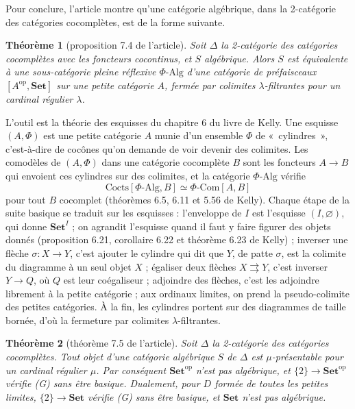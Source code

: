 \documentclass[11pt,a4paper]{amsart}
\theoremstyle{definition}
\theoremstyle{plain}
\newtheorem{theoreme}{Théorème}
\theoremstyle{remark}
\newcommand{\Set}{\mathbf{Set}}
\begin{document}
Pour conclure, l'article montre qu'une catégorie algébrique, dans la 2-catégorie des catégories cocomplètes, est de la forme suivante.

\begin{theoreme}[proposition 7.4 de l'article]
Soit $\Delta$ la 2-catégorie des catégories cocomplètes avec les foncteurs cocontinus, et $S$ algébrique. Alors $S$ est équivalente à une sous-catégorie pleine réflexive $\Phi\text{-}\mathrm{Alg}$ d'une catégorie de préfaisceaux $[A^{\mathrm{op}},\Set]$ sur une petite catégorie $A$, fermée par colimites $\lambda$-filtrantes pour un cardinal régulier $\lambda$.
\end{theoreme}

L'outil est la théorie des esquisses du chapitre 6 du livre de Kelly. Une esquisse $(A,\Phi)$ est une petite catégorie $A$ munie d'un ensemble $\Phi$ de «~cylindres~», c'est-à-dire de cocônes qu'on demande de voir devenir des colimites. Les comodèles de $(A,\Phi)$ dans une catégorie cocomplète $B$ sont les foncteurs $A\to B$ qui envoient ces cylindres sur des colimites, et la catégorie $\Phi\text{-}\mathrm{Alg}$ vérifie
\[\mathrm{Cocts}[\Phi\text{-}\mathrm{Alg},B]\simeq\Phi\text{-}\mathrm{Com}[A,B]\]
pour tout $B$ cocomplet (théorèmes 6.5, 6.11 et 5.56 de Kelly). Chaque étape de la suite basique se traduit sur les esquisses : l'enveloppe de $I$ est l'esquisse $(I,\varnothing)$, qui donne $\Set^I$ ; on agrandit l'esquisse quand il faut y faire figurer des objets donnés (proposition 6.21, corollaire 6.22 et théorème 6.23 de Kelly) ; inverser une flèche $\sigma\colon X\to Y$, c'est ajouter le cylindre qui dit que $Y$, de patte $\sigma$, est la colimite du diagramme à un seul objet $X$ ; égaliser deux flèches $X\rightrightarrows Y$, c'est inverser $Y\to Q$, où $Q$ est leur coégaliseur ; adjoindre des flèches, c'est les adjoindre librement à la petite catégorie ; aux ordinaux limites, on prend la pseudo-colimite des petites catégories. À la fin, les cylindres portent sur des diagrammes de taille bornée, d'où la fermeture par colimites $\lambda$-filtrantes.

\begin{theoreme}[théorème 7.5 de l'article]
Soit $\Delta$ la 2-catégorie des catégories cocomplètes. Tout objet d'une catégorie algébrique $S$ de $\Delta$ est $\mu$-présentable pour un cardinal régulier $\mu$. Par conséquent $\Set^{\mathrm{op}}$ n'est pas algébrique, et $\{2\}\to\Set^{\mathrm{op}}$ vérifie (G) sans être basique. Dualement, pour $D$ formée de toutes les petites limites, $\{2\}\to\Set$ vérifie (G) sans être basique, et $\Set$ n'est pas algébrique.
\end{theoreme}
\end{document}
